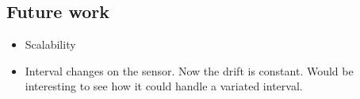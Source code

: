 \subsection{Future work}
\begin{itemize}
\item Scalability
\item Interval changes on the sensor. Now the drift is constant. Would be interesting to see how it could handle a variated interval.
\end{itemize}